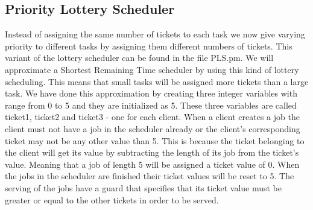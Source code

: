 \documentclass[12pt]{report}
\begin{document}
\subsection*{Priority Lottery Scheduler}
Instead of assigning the same number of tickets to each task we now give varying priority to different tasks by assigning them different numbers of tickets. This variant of the lottery scheduler can be found in the file PLS.pm. We will approximate a Shortest Remaining Time scheduler by using this kind of lottery scheduling. This means that small tasks will be assigned more tickets than a large task. We have done this approximation by creating three integer variables with range from 0 to 5 and they are initialized as 5. These three variables are called ticket1, ticket2 and ticket3 - one for each client. When a client creates a job the client must not have a job in the scheduler already or the client's corresponding ticket may not be any other value than 5. This is because the ticket belonging to the client will get its value by subtracting the length of its job from the ticket's value. Meaning that a job of length 5 will be assigned a ticket value of 0. When the jobs in the scheduler are finished their ticket values will be reset to 5. The serving of the jobs have a guard that specifies that its ticket value must be greater or equal to the other tickets in order to be served.
\end{document}
